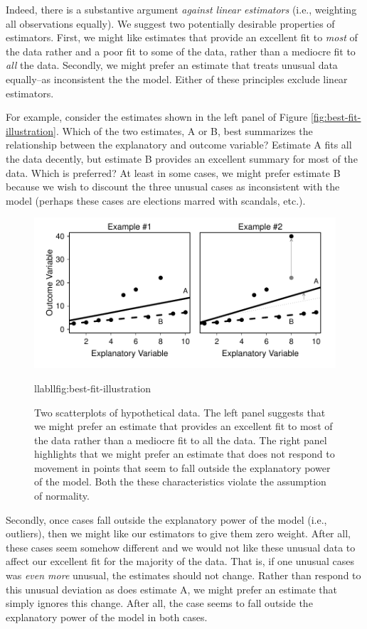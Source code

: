 \documentclass[12pt]{article}
\begin{document}
Indeed, there is a substantive argument \textit{against linear estimators} (i.e., weighting all observations equally). We suggest two potentially desirable properties of estimators. First, we might like estimates that provide an excellent fit to \textit{most} of the data rather and a poor fit to some of the data, rather than a mediocre fit to \textit{all} the data. Secondly, we might prefer an estimate that treats unusual data equally--as inconsistent the the model. Either of these principles exclude linear estimators.

For example, consider the estimates shown in the left panel of Figure \ref{fig:best-fit-illustration}. Which of the two estimates, A or B, best summarizes the relationship between the explanatory and outcome variable? Estimate A fits all the data decently, but estimate B provides an excellent summary for most of the data. Which is preferred? At least in some cases, we might prefer estimate B because we wish to discount the three unusual cases as inconsistent with the model (perhaps these cases are elections marred with scandals, etc.).

\begin{figure}[H]
\begin{center}
\includegraphics[scale = .7]{figs/best-fit-illustration.pdf}
\caption{Two scatterplots of hypothetical data. The left panel suggests that we might prefer an estimate that provides an excellent fit to most of the data rather than a mediocre fit to all the data. The right panel highlights that we might prefer an estimate that does not respond to movement in points that seem to fall outside the explanatory power of the model. Both the these characteristics violate the assumption of normality.}llabll{fig:best-fit-illustration}
\end{center}
\end{figure}

Secondly, once cases fall outside the explanatory power of the model (i.e., outliers), then we might like our estimators to give them zero weight. After all, these cases seem somehow different and we would not like these unusual data to affect our excellent fit for the majority of the data. That is, if one unusual cases was \textit{even more} unusual, the estimates should not change. Rather than respond to this unusual deviation as does estimate A, we might prefer an estimate that simply ignores this change. After all, the case seems to fall outside the explanatory power of the model in both cases.
\end{document}
